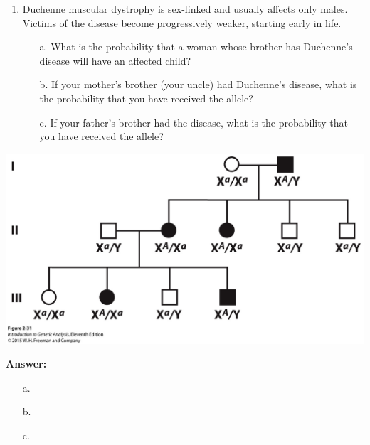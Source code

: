 \documentclass[11pt,]{article}
\providecommand{\tightlist}{%
  \setlength{\itemsep}{0pt}\setlength{\parskip}{0pt}}
\begin{document}
\begin{blackbox}

\begin{enumerate}
\def\labelenumi{\arabic{enumi}.}
\setcounter{enumi}{60}
\tightlist
\item
  Duchenne muscular dystrophy is sex-linked and usually affects only
  males. Victims of the disease become progressively weaker, starting
  early in life.

  \begin{enumerate} 
   \item[a.]{ What is the probability that a woman whose brother has Duchenne’s disease will have an affected child? } 
   \item[b.]{ If your mother’s brother (your uncle) had Duchenne’s disease, what is the probability that you have received the allele? } 
   \item[c.]{ If your father’s brother had the disease, what is the probability that you have received the allele? } 
   \end{enumerate}
\end{enumerate}

\begin{center}\includegraphics[width=0.35\linewidth,]{input/figure_02_31} \end{center}

\textbf{Answer:}

\begin{enumerate} 
 \item[a.]{  } 
 \item[b.]{  } 
 \item[c.]{  } 
 \end{enumerate}

\end{blackbox}
\end{document}
